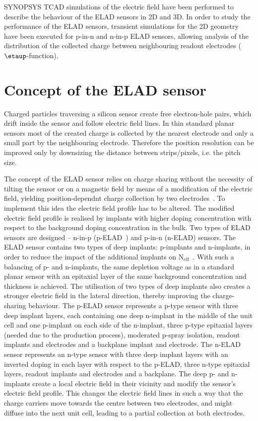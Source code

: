 \documentclass[a4paper,11pt]{article}
\begin{document}
SYNOPSYS TCAD simulations of the electric field have been performed to describe the behaviour of the ELAD sensors in 2D and 3D.
In order to study the performance of the ELAD sensors, transient simulations for the 2D geometry have been executed for p-in-n and n-in-p ELAD sensors, allowing analysis of the distribution of the collected charge between neighbouring readout electrodes ($\etaup$-function). 

\section{Concept of the ELAD sensor}
\label{sec:con}
Charged particles traversing a silicon sensor create free electron-hole pairs, which drift inside the sensor and follow electric field lines.
In thin standard planar sensors most of the created charge is collected by the nearest electrode and only a small part by the neighbouring electrode.
Therefore the position resolution can be improved only by downsizing the distance between strips/pixels, i.e. the pitch size.

The concept of the ELAD sensor relies on charge sharing without the necessity of tilting the sensor or on a magnetic field by means of a modification of the electric field, yielding position-dependnt charge collection by two electrodes~\cite{hj}.
To implement this idea the electric field profile has to be altered.
The modified electric field profile is realised by implants with higher doping concentration with respect to the background doping concentration in the bulk. 
Two types of ELAD sensors are designed -- n-in-p (p-ELAD~\cite{elad}) and p-in-n (n-ELAD) sensors. 
The ELAD sensor contains two types of deep implants: p-implants and n-implants, in order to reduce the impact of the additional implants on $\mathrm{N_{eff}}$~\cite{elad}. 
With such a balancing of p- and n-implants, the same depletion voltage as in a standard planar sensor with an epitaxial layer of the same background concentration and thickness is achieved.
The utilisation of two types of deep implants also creates a stronger electric field in the lateral direction, thereby improving the charge-sharing behaviour.
The p-ELAD sensor represents a p-type sensor with three deep implant layers, each containing one deep n-implant in the middle of the unit cell and one p-implant on each side of the n-implant, three p-type epitaxial layers (needed due to the production process), moderated p-spray isolation, readout implants and electrodes and a backplane implant and electrode.
The n-ELAD sensor represents an n-type sensor with three deep implant layers with an inverted doping in each layer with respect to the p-ELAD, three n-type epitaxial layers, readout implants and electrodes and a backplane.
The deep p- and n-implants create a local electric field in their vicinity and modify the sensor's electric field profile.
This changes the electric field lines in such a way that the charge carriers move towards the centre between two electrodes, and might diffuse into the next unit cell, leading to a partial collection at both electrodes.
\end{document}
